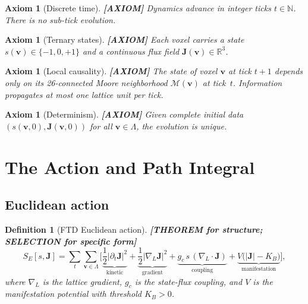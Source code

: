 \documentclass[11pt]{article}
\theoremstyle{tight}
\theoremstyle{plainroman}
\newtheorem{axiom}[theorem]{Axiom}
\newtheorem{definition}[theorem]{Definition}
\newcommand{\R}{\mathbb{R}}
\newcommand{\N}{\mathbb{N}}
\begin{document}
\begin{axiom}[Discrete time]
\textbf{[AXIOM]}
Dynamics advance in integer ticks $t\in\N$.
There is no sub-tick evolution.
\end{axiom}

\begin{axiom}[Ternary states]
\textbf{[AXIOM]}
Each voxel carries a state $s(\mathbf v)\in\{-1,0,+1\}$ and a continuous flux field $\mathbf J(\mathbf v)\in\R^3$.
\end{axiom}

\begin{axiom}[Local causality]
\textbf{[AXIOM]}
The state of voxel $\mathbf v$ at tick $t+1$ depends only on its 26-connected Moore neighborhood $\mathcal M(\mathbf v)$ at tick~$t$.
Information propagates at most one lattice unit per tick.
\end{axiom}

\begin{axiom}[Determinism]
\textbf{[AXIOM]}
Given complete initial data $(s(\mathbf v,0),\mathbf J(\mathbf v,0))$ for all $\mathbf v\in\Lambda$, the evolution is unique.
\end{axiom}

\section{The Action and Path Integral}

\subsection{Euclidean action}

\begin{definition}[FTD Euclidean action]
\textbf{[THEOREM for structure; SELECTION for specific form]}
\begin{equation}\label{eq:action}
S_E[s,\mathbf J]=\sum_{t}\sum_{\mathbf v\in\Lambda}\biggl[
\underbrace{\frac{1}{2}|\partial_t\mathbf J|^2}_{\text{kinetic}}
+\underbrace{\frac{1}{2}|\nabla_L\mathbf J|^2}_{\text{gradient}}
+\underbrace{g_c\,s\,(\nabla_L\!\cdot\!\mathbf J)}_{\text{coupling}}
+\underbrace{V\bigl(|\mathbf J|-K_B\bigr)}_{\text{manifestation}}
\biggr],
\end{equation}
where $\nabla_L$ is the lattice gradient, $g_c$ is the state-flux coupling, and $V$ is the manifestation potential with threshold $K_B>0$.
\end{definition}
\end{document}
